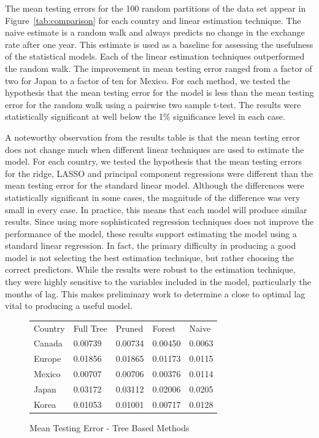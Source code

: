\documentclass{sig-alternate-05-2015}
\begin{document}
The mean testing errors for the 100 random partitions of the data set appear in Figure~\ref{tab:comparison} for each country and linear estimation technique. The naive estimate is a random walk and always predicts no change in the exchange rate after one year. This estimate is used as a baseline for assessing the usefulness of the statistical models. Each of the linear estimation techniques outperformed the random walk. The improvement in mean testing error ranged from a factor of two for Japan to a factor of ten for Mexico. For each method, we tested the hypothesis that the mean testing error for the model is less than the mean testing error for the random walk using a pairwise two sample t-test. The results were statistically significant at well below the 1\% significance level in each case.
\par{} A noteworthy observation from the results table is that the mean testing error does not change much when different linear techniques are used to estimate the model. For each country, we tested the hypothesis that the mean testing errors for the ridge, LASSO and principal component regressions were different than the mean testing error for the standard linear model. Although the differences were statistically significant in some cases, the magnitude of the difference was very small in every case. In practice, this means that each model will produce similar results. Since using more sophisticated regression techniques does not improve the performance of the model, these results support estimating the model using a standard linear regression. In fact, the primary difficulty in producing a good model is not selecting the best estimation technique, but rather choosing the correct predictors. While the results were robust to the estimation technique, they were highly sensitive to the variables included in the model, particularly the months of lag. This makes preliminary work to determine a close to optimal lag vital to producing a useful model.

\begin{figure}
\centering
\caption{Mean Testing Error - Tree Based Methods}
\begin{tabular}{l l l l l}
Country	& Full Tree & Pruned    & Forest    & Naive \\
Canada 	& 0.00739 	& 0.00734 	& 0.00450 	& 0.0063 \\
Europe	& 0.01856 	& 0.01865 	& 0.01173	& 0.0115 \\
Mexico	& 0.00707 	& 0.00706 	& 0.00376   & 0.0114 \\
Japan	& 0.03172 	& 0.03112 	& 0.02006   & 0.0205 \\
Korea	& 0.01053 	& 0.01001 	& 0.00717	& 0.0128 \\
\end{tabular}
\label{tab:treecomparison}
\end{figure} 
\end{document}
